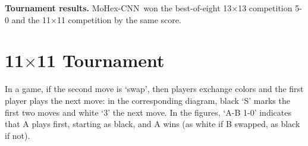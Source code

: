 \documentclass{IOS-Book-Article}
\def\Ec{\mbox{\sc Ezo-CNN}}
\def\Mx{\mbox{\sc MoHex}}
\def\Mc{\mbox{\sc MoHex-CNN}}
\begin{document}
{\bf Tournament results.}
\Mc\ won the best-of-eight 13$\times$13 competition 5-0
and the 11$\times$11 competition by the same score.


\section{11$\times$11 Tournament}
In a game, if the second move is `swap', then players
exchange colors and the first player plays the next move:
in the corresponding diagram, black `S' marks the first two moves
and white `3' the next move.
In the figures, `A-B 1-0' indicates that A plays first, starting as black, 
and A wins (as white if B swapped, as black if not).

\end{document}
